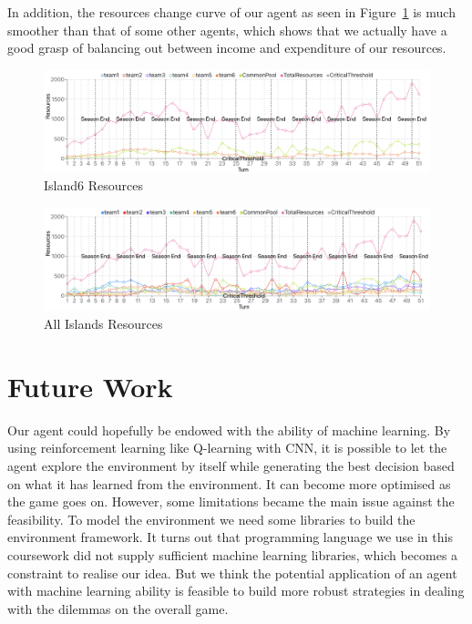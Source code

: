 In addition, the resources change curve of our agent as seen in Figure~\ref{fig:team 6} is much smoother than that of some other agents, which shows that we actually have a good grasp of balancing out between income and expenditure of our resources. \\
\begin{figure}[htp]
    \centering
    \includegraphics[width=15cm]{14_team6_agentdesign/images/resources 1.png}
    \caption{Island6 Resources}
    \label{fig:team 6}
\end{figure}
\begin{figure}[htp]
    \centering
    \includegraphics[width=15cm]{14_team6_agentdesign/images/resources 2.png}
    \caption{All Islands Resources}
    \label{fig:all teams}
\end{figure}

\section{Future Work} \label{sec:Team6_Future}
Our agent could hopefully be endowed with the ability of machine learning. By using reinforcement learning like Q-learning with CNN, it is possible to let the agent explore the environment by itself while generating the best decision based on what it has learned from the environment. It can become more optimised as the game goes on. However, some limitations became the main issue against the feasibility. To model the environment we need some libraries to build the environment framework. It turns out that programming language we use in this coursework did not supply sufficient machine learning libraries, which becomes a constraint to realise our idea. But we think the potential application of an agent with machine learning ability is feasible to build more robust strategies in dealing with the dilemmas on the overall game.